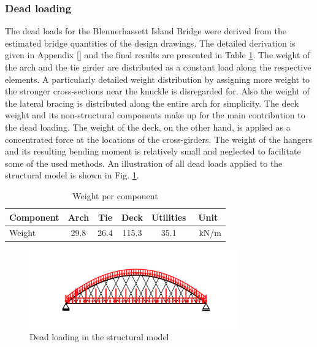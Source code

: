 \subsubsection{Dead loading}
The dead loads for the Blennerhassett Island Bridge were derived from the estimated bridge quantities of the design drawings. The detailed derivation is given in Appendix [] and the final results are presented in Table \ref{tab:dead_loads}. The weight of the arch and the tie girder are distributed as a constant load along the respective elements. A particularly detailed weight distribution by assigning more weight to the stronger cross-sections near the knuckle is disregarded for. Also the weight of the lateral bracing is distributed along the entire arch for simplicity. The deck weight and its non-structural components make up for the main contribution to the dead loading. The weight of the deck, on the other hand, is applied as a concentrated force at the locations of the cross-girders. The weight of the hangers and its resulting bending moment is relatively small and neglected to facilitate some of the used methods. An illustration of all dead loads applied to the structural model is shown in Fig. \ref{fig:dead_loads}.

\begin{table}[H]
    \centering
    \begin{tabular}{lccccc}
        Component & Arch & Tie & Deck & Utilities & Unit \\ \hline
        Weight & 29.8 & 26.4 & 115.3 & 35.1 & \SI{}{kN/m}
    \end{tabular}
    \caption{Weight per component}
    \label{tab:dead_loads}
\end{table}

\begin{figure}[H]
    \centering
    \includegraphics[trim={0 0.8cm 0 0.8cm},clip,
    width=0.8\textwidth]{illustrations/figures/permanent loads.png}
    \caption{Dead loading in the structural model}
    \label{fig:dead_loads}
\end{figure}

